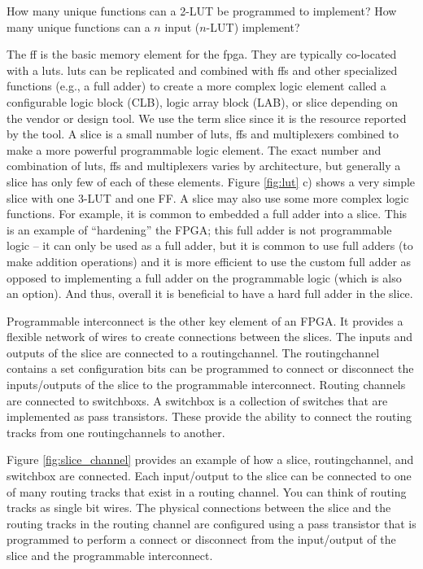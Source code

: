 \begin{exercise}
How many unique functions can a 2-LUT be programmed to implement? How many unique functions can a $n$ input ($n$-LUT) implement? 
\end{exercise}

The \gls{ff} is the basic memory element for the \gls{fpga}. They are typically co-located with a \glspl{lut}. \gls{lut}s can be replicated and combined with \glspl{ff} and other specialized functions (e.g., a full adder) to create a more complex logic element called a configurable logic block (CLB), logic array block (LAB), or \gls{slice} depending on the vendor or design tool. We use the term \gls{slice} since it is the resource reported by the \VHLS tool.  A \gls{slice} is a small number of \glspl{lut}, \glspl{ff} and multiplexers combined to make a more powerful programmable logic element. The exact number and combination of  \glspl{lut}, \glspl{ff} and multiplexers varies by architecture, but generally a slice has only few of each of these elements. Figure \ref{fig:lut} c) shows a very simple slice with one 3-LUT and one FF. A \gls{slice} may also use some more complex logic functions. For example, it is common to embedded a full adder into a slice. This is an example of ``hardening'' the FPGA; this full adder is not programmable logic -- it can only be used as a full adder, but it is common to use full adders (to make addition operations) and it is more efficient to use the custom full adder as opposed to implementing a full adder on the programmable logic (which is also an option). And thus, overall it is beneficial to have a hard full adder in the slice.

Programmable interconnect is the other key element of an FPGA. It provides a flexible network of wires to create connections between the slices. The inputs and outputs of the \gls{slice} are connected to a \gls{routingchannel}. The \gls{routingchannel} contains a set configuration bits can be programmed to connect or disconnect the inputs/outputs of the \gls{slice} to the programmable interconnect. Routing channels are connected to \glspl{switchbox}. A \gls{switchbox} is a collection of switches that are implemented as pass transistors. These provide the ability to connect the routing tracks from one \glspl{routingchannel} to another. 

Figure \ref{fig:slice_channel} provides an example of how a \gls{slice}, \gls{routingchannel}, and \gls{switchbox} are connected. Each input/output to the \gls{slice} can be connected to one of many routing tracks that exist in a routing channel. You can think of routing tracks as single bit wires. The physical connections between the slice and the routing tracks in the routing channel are configured using a pass transistor that is programmed to perform a connect or disconnect from the input/output of the slice and the programmable interconnect. 


